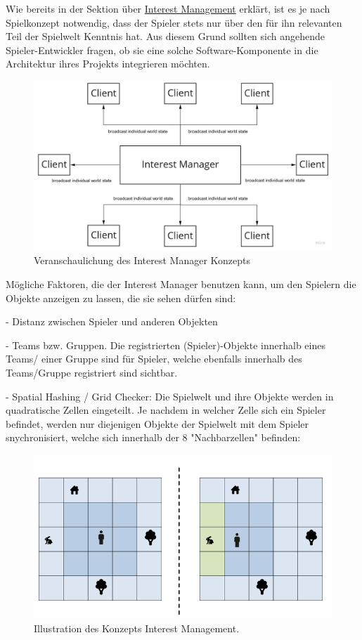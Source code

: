 Wie bereits in der Sektion über \hyperref[interest_management]{Interest Management} erklärt, ist es je nach Spielkonzept notwendig, dass der Spieler stets nur über den für ihn relevanten Teil der Spielwelt Kenntnis hat. Aus diesem Grund sollten sich angehende Spieler-Entwickler fragen, ob sie eine solche Software-Komponente in die Architektur ihres Projekts integrieren möchten.

\begin{figure}
	\centering
	\includegraphics[width=150mm]{images/Interest_Manager.jpg}
	\caption[Interest Manager]{Veranschaulichung des Interest Manager Konzepts}
	\label{pic:Interest_Manager}
\end{figure}

Mögliche Faktoren, die der Interest Manager benutzen kann, um den Spielern die Objekte anzeigen zu lassen, die sie sehen dürfen sind:

- Distanz zwischen Spieler und anderen Objekten

- Teams bzw. Gruppen. Die registrierten (Spieler)-Objekte innerhalb eines Teams/ einer Gruppe sind für Spieler, welche ebenfalls innerhalb des Teams/Gruppe registriert sind sichtbar.

- Spatial Hashing / Grid Checker: Die Spielwelt und ihre Objekte werden in quadratische Zellen eingeteilt. Je nachdem in welcher Zelle sich ein Spieler befindet, werden nur diejenigen Objekte der Spielwelt mit dem Spieler snychronisiert, welche sich innerhalb der 8 "Nachbarzellen" befinden:

\begin{figure}
	\centering
	\includegraphics[width=150mm]{images/interest_management.png}
	\caption[Interest Management]{Illustration des Konzepts Interest Management. \cite{JeromeRenaux.2017} }
	\label{pic:interest_management}
\end{figure}

